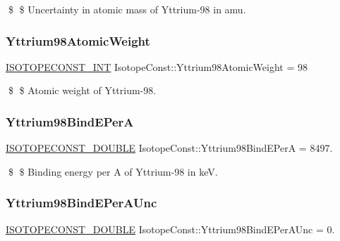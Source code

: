 \$ \$ Uncertainty in atomic mass of Yttrium-\/98 in amu. \mbox{\label{group___isotope_const-_yttrium-_y98_gaefa43caa0baf96e3f0be84361388670b}} 
\subsubsection{\texorpdfstring{Yttrium98\+Atomic\+Weight}{Yttrium98AtomicWeight}}
{\footnotesize\ttfamily \mbox{\hyperlink{group___isotope_const-_macros_ga5f18360b3e99483a35c32d789e62621c}{I\+S\+O\+T\+O\+P\+E\+C\+O\+N\+S\+T\+\_\+\+I\+NT}} Isotope\+Const\+::\+Yttrium98\+Atomic\+Weight = 98}

\$ \$ Atomic weight of Yttrium-\/98. \mbox{\label{group___isotope_const-_yttrium-_y98_ga0126abc87da2be2d287ff422139d0c03}} 
\subsubsection{\texorpdfstring{Yttrium98\+Bind\+E\+PerA}{Yttrium98BindEPerA}}
{\footnotesize\ttfamily \mbox{\hyperlink{group___isotope_const-_macros_ga8f45a7272ce02c0b4c65c44636ed719a}{I\+S\+O\+T\+O\+P\+E\+C\+O\+N\+S\+T\+\_\+\+D\+O\+U\+B\+LE}} Isotope\+Const\+::\+Yttrium98\+Bind\+E\+PerA = 8497.}

\$ \$ Binding energy per A of Yttrium-\/98 in keV. \mbox{\label{group___isotope_const-_yttrium-_y98_ga8d4c1d452f7a2d4dea3a5ca306bcef69}} 
\subsubsection{\texorpdfstring{Yttrium98\+Bind\+E\+Per\+A\+Unc}{Yttrium98BindEPerAUnc}}
{\footnotesize\ttfamily \mbox{\hyperlink{group___isotope_const-_macros_ga8f45a7272ce02c0b4c65c44636ed719a}{I\+S\+O\+T\+O\+P\+E\+C\+O\+N\+S\+T\+\_\+\+D\+O\+U\+B\+LE}} Isotope\+Const\+::\+Yttrium98\+Bind\+E\+Per\+A\+Unc = 0.}

